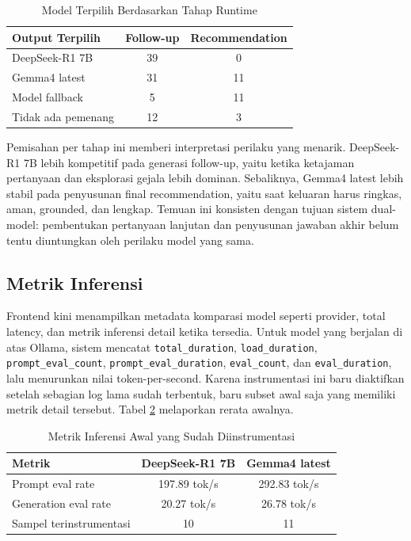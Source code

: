 \documentclass[conference]{IEEEtran}
\begin{document}
\begin{table}[t]
\caption{Model Terpilih Berdasarkan Tahap Runtime}
\label{tab:stage_wins_id}
\centering
\footnotesize
\begin{tabular}{|l|c|c|}
\hline
\textbf{Output Terpilih} & \textbf{Follow-up} & \textbf{Recommendation} \\
\hline
DeepSeek-R1 7B & 39 & 0 \\
\hline
Gemma4 latest & 31 & 11 \\
\hline
Model fallback & 5 & 11 \\
\hline
Tidak ada pemenang & 12 & 3 \\
\hline
\end{tabular}
\end{table}

Pemisahan per tahap ini memberi interpretasi perilaku yang menarik. DeepSeek-R1 7B lebih kompetitif pada generasi follow-up, yaitu ketika ketajaman pertanyaan dan eksplorasi gejala lebih dominan. Sebaliknya, Gemma4 latest lebih stabil pada penyusunan final recommendation, yaitu saat keluaran harus ringkas, aman, grounded, dan lengkap. Temuan ini konsisten dengan tujuan sistem dual-model: pembentukan pertanyaan lanjutan dan penyusunan jawaban akhir belum tentu diuntungkan oleh perilaku model yang sama.

\subsection{Metrik Inferensi}
Frontend kini menampilkan metadata komparasi model seperti provider, total latency, dan metrik inferensi detail ketika tersedia. Untuk model yang berjalan di atas Ollama, sistem mencatat \texttt{total\_duration}, \texttt{load\_duration}, \texttt{prompt\_eval\_count}, \texttt{prompt\_eval\_duration}, \texttt{eval\_count}, dan \texttt{eval\_duration}, lalu menurunkan nilai token-per-second. Karena instrumentasi ini baru diaktifkan setelah sebagian log lama sudah terbentuk, baru subset awal saja yang memiliki metrik detail tersebut. Tabel \ref{tab:inference_metrics_id} melaporkan rerata awalnya.

\begin{table}[t]
\caption{Metrik Inferensi Awal yang Sudah Diinstrumentasi}
\label{tab:inference_metrics_id}
\centering
\footnotesize
\begin{tabular}{|l|c|c|}
\hline
\textbf{Metrik} & \textbf{DeepSeek-R1 7B} & \textbf{Gemma4 latest} \\
\hline
Prompt eval rate & 197.89 tok/s & 292.83 tok/s \\
\hline
Generation eval rate & 20.27 tok/s & 26.78 tok/s \\
\hline
Sampel terinstrumentasi & 10 & 11 \\
\hline
\end{tabular}
\end{table}
\end{document}
